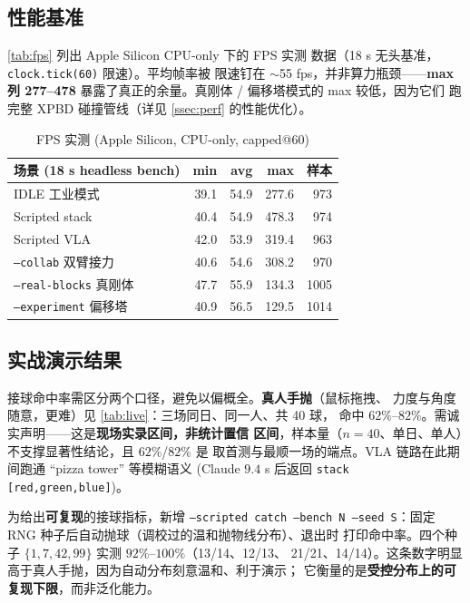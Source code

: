 \documentclass[12pt, a4paper, UTF8]{ctexart}
\begin{document}
\subsection{性能基准}
\autoref{tab:fps} 列出 Apple Silicon CPU-only 下的 FPS 实测
数据（18 s 无头基准，\texttt{clock.tick(60)} 限速）。平均帧率被
限速钉在 $\sim$55 fps，并非算力瓶颈——\textbf{max 列 277--478}
暴露了真正的余量。真刚体 / 偏移塔模式的 max 较低，因为它们
跑完整 XPBD 碰撞管线（详见 \ref{ssec:perf} 的性能优化）。

\begin{table}[h]
\centering
\small
\caption{FPS 实测 (Apple Silicon, CPU-only, capped@60)}
\label{tab:fps}
\begin{tabular}{lrrrr}
\toprule
场景 (18 s headless bench) & min & avg & max & 样本 \\
\midrule
IDLE 工业模式               & 39.1 & 54.9 & 277.6 &  973 \\
Scripted stack             & 40.4 & 54.9 & 478.3 &  974 \\
Scripted VLA               & 42.0 & 53.9 & 319.4 &  963 \\
\texttt{--collab} 双臂接力       & 40.6 & 54.6 & 308.2 &  970 \\
\texttt{--real-blocks} 真刚体    & 47.7 & 55.9 & 134.3 & 1005 \\
\texttt{--experiment} 偏移塔     & 40.9 & 56.5 & 129.5 & 1014 \\
\bottomrule
\end{tabular}
\end{table}

\subsection{实战演示结果}
接球命中率需区分两个口径，避免以偏概全。\textbf{真人手抛}（鼠标拖拽、
力度与角度随意，更难）见 \autoref{tab:live}：三场同日、同一人、共 40 球，
命中 $62\%$--$82\%$。需诚实声明——这是\textbf{现场实录区间，非统计置信
区间}，样本量（$n=40$、单日、单人）不支撑显著性结论，且 $62\%$/$82\%$ 是
取首测与最顺一场的端点。VLA 链路在此期间跑通 ``pizza tower'' 等模糊语义
(Claude $9.4$ s 后返回 \texttt{stack [red,green,blue]})。

为给出\textbf{可复现}的接球指标，新增 \texttt{--scripted catch --bench
N --seed S}：固定 RNG 种子后自动抛球（调校过的温和抛物线分布）、退出时
打印命中率。四个种子 $\{1,7,42,99\}$ 实测 $92\%$--$100\%$（13/14、12/13、
21/21、14/14）。这条数字明显高于真人手抛，因为自动分布刻意温和、利于演示；
它衡量的是\textbf{受控分布上的可复现下限}，而非泛化能力。
\end{document}
